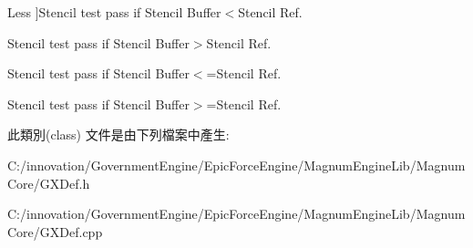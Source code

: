\begin{Desc}
\begin{description}
{Less\hypertarget{class_i_dream_sky_1_1_g_x_stencil_test_mode_a19e795f814b59e64cf9394fe9bd2a5f2abf83788a53313a239b88e7d16b3f8e7f}{}\label{class_i_dream_sky_1_1_g_x_stencil_test_mode_a19e795f814b59e64cf9394fe9bd2a5f2abf83788a53313a239b88e7d16b3f8e7f}
}]Stencil test pass if Stencil Buffer$<$Stencil Ref. \item[{\em 
Greater\hypertarget{class_i_dream_sky_1_1_g_x_stencil_test_mode_a19e795f814b59e64cf9394fe9bd2a5f2ac544a2a043f2a84df3f8b9f8a6f856a2}{}\label{class_i_dream_sky_1_1_g_x_stencil_test_mode_a19e795f814b59e64cf9394fe9bd2a5f2ac544a2a043f2a84df3f8b9f8a6f856a2}
}]Stencil test pass if Stencil Buffer$>$Stencil Ref. \item[{\em 
L\+Equal\hypertarget{class_i_dream_sky_1_1_g_x_stencil_test_mode_a19e795f814b59e64cf9394fe9bd2a5f2a3d3e874b3f871e61cc9bfab2d0bb132e}{}\label{class_i_dream_sky_1_1_g_x_stencil_test_mode_a19e795f814b59e64cf9394fe9bd2a5f2a3d3e874b3f871e61cc9bfab2d0bb132e}
}]Stencil test pass if Stencil Buffer$<$=Stencil Ref. \item[{\em 
G\+Equal\hypertarget{class_i_dream_sky_1_1_g_x_stencil_test_mode_a19e795f814b59e64cf9394fe9bd2a5f2a9401a2b967ed4afebca43d87775ea83b}{}\label{class_i_dream_sky_1_1_g_x_stencil_test_mode_a19e795f814b59e64cf9394fe9bd2a5f2a9401a2b967ed4afebca43d87775ea83b}
}]Stencil test pass if Stencil Buffer$>$=Stencil Ref. \end{description}
\end{Desc}


此類別(class) 文件是由下列檔案中產生\+:\begin{DoxyCompactItemize}
\item 
C\+:/innovation/\+Government\+Engine/\+Epic\+Force\+Engine/\+Magnum\+Engine\+Lib/\+Magnum\+Core/G\+X\+Def.\+h\item 
C\+:/innovation/\+Government\+Engine/\+Epic\+Force\+Engine/\+Magnum\+Engine\+Lib/\+Magnum\+Core/G\+X\+Def.\+cpp\end{DoxyCompactItemize}
